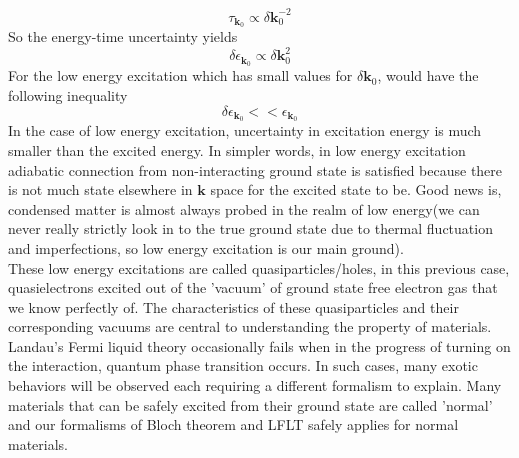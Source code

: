 \documentclass{article}
\begin{document}
$$\tau_{\mathbf{k}_0}\propto\delta \mathbf{k}_0^{-2}$$
So the energy-time uncertainty yields
$$\delta\epsilon_{\mathbf{k}_0}\propto\delta\mathbf{k}_0^2$$
For the low energy excitation which has small values for $\delta\mathbf{k}_0$, would have the following inequality
$$\delta\epsilon_{\mathbf{k}_0}<<\epsilon_{\mathbf{k}_0}$$
In the case of low energy excitation, uncertainty in excitation energy is much smaller than the excited energy. In simpler words, in low energy excitation adiabatic connection from non-interacting ground state is satisfied because there is not much state elsewhere in $\mathbf{k}$ space for the excited state to be. Good news is, condensed matter is almost always probed in the realm of low energy(we can never really strictly look in to the true ground state due to thermal fluctuation and imperfections, so low energy excitation is our main ground).\\
These low energy excitations are called quasiparticles/holes, in this previous case, quasielectrons excited out of the 'vacuum' of ground state free electron gas that we know perfectly of. The characteristics of these quasiparticles and their corresponding vacuums are central to understanding the property of materials. Landau's Fermi liquid theory occasionally fails when in the progress of turning on the interaction, quantum phase transition occurs. In such cases, many exotic behaviors will be observed each requiring a different formalism to explain. Many materials that can be safely excited from their ground state are called 'normal' and our formalisms of Bloch theorem and LFLT safely applies for normal materials.
\end{document}
